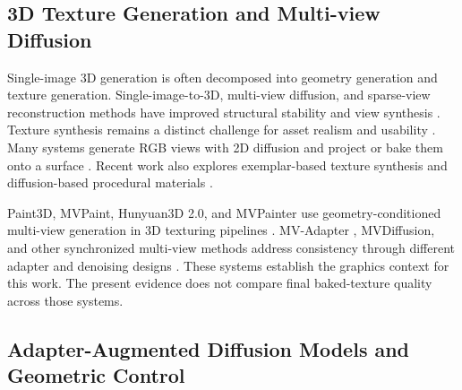 \documentclass[times,twocolumn,final]{elsarticle}
\providecommand{\DIFadd}[1]{{\protect\color{blue} \sf #1}} %
\providecommand{\DIFaddbegin}{} %
\providecommand{\DIFaddend}{} %
\begin{document}
\subsection{3D Texture Generation and Multi-view Diffusion}
\label{subsec:3dtex}

Single-image 3D generation is often decomposed into geometry generation and texture generation.   \DIFaddbegin \DIFadd{Single-image-to-3D}\DIFaddend , multi-view diffusion, and sparse-view reconstruction methods have   \DIFaddbegin \DIFadd{improved structural stability and view synthesis \cite{liu2023zero1to3,shi2023zero123pp,liu2023syncdreamer,long2023wonder3d,shi2024mvdream,wang2023imagedream,xu2024instantmesh,ke2024era3d}. Texture synthesis remains a distinct challenge for asset }\DIFaddend realism and usability   \DIFaddbegin \DIFadd{\cite{perla2026survey}. Many systems generate RGB views with }\DIFaddend 2D   \DIFaddbegin \DIFadd{diffusion and }\DIFaddend project or bake   \DIFaddbegin \DIFadd{them onto a }\DIFaddend surface \cite{chen2023text2tex,richardson2023texture,poole2023dreamfusion,chen2023fantasia3d}.   \DIFaddbegin \DIFadd{Recent work also explores }\DIFaddend exemplar-based texture synthesis   \DIFaddbegin \DIFadd{and }\DIFaddend diffusion-based procedural   \DIFaddbegin \DIFadd{materials \cite{guzman2026adaptive,lv2025interpretable}}\DIFaddend .

  Paint3D, MVPaint, Hunyuan3D 2.0, and MVPainter   \DIFaddbegin \DIFadd{use geometry-conditioned }\DIFaddend multi-view   \DIFaddbegin \DIFadd{generation in 3D texturing pipelines }\DIFaddend \cite{zeng2024paint3d,cheng2024mvpaint,lai2025hunyuan3d,shao2025mvpainter}. MV-Adapter  \DIFaddbegin \DIFadd{, MVDiffusion, and other }\DIFaddend synchronized multi-view   \DIFaddbegin \DIFadd{methods address consistency through different adapter and denoising designs \cite{huang2024mvadapter,tang2023mvdiffusion,liu2024synchronized,xu2026wondertex}. These systems establish the graphics context for this work. The present evidence does not compare final baked-texture quality across those systems}\DIFaddend .

  \DIFaddbegin \subsection{Adapter-Augmented Diffusion Models and Geometric Control}
\DIFaddend \label{subsec:adapter}
\end{document}
